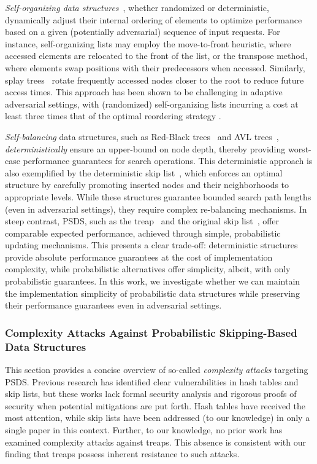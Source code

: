 \emph{Self-organizing data structures}~\cite{albers2005self}, whether randomized or deterministic, dynamically adjust their internal ordering of elements to optimize performance based on a given (potentially adversarial) sequence of input requests. For instance, self-organizing lists may employ the move-to-front heuristic, where accessed elements are relocated to the front of the list, or the transpose method, where elements swap positions with their predecessors when accessed. Similarly, splay trees~\cite{sleator1985self} rotate frequently accessed nodes closer to the root to reduce future access times. This approach has been shown to be challenging in adaptive adversarial settings, with (randomized) self-organizing lists incurring a cost at least three times that of the optimal reordering strategy \cite{reingold1994randomized}. 

\emph{Self-balancing} data structures, such as Red-Black trees~\cite{bayer1972symmetric} and AVL trees~\cite{adel1962algorithm}, \emph{deterministically} ensure an upper-bound on node depth, thereby providing worst-case performance guarantees for search operations. This deterministic approach is also exemplified by the deterministic skip list~\cite{munro1992deterministic}, which enforces an optimal structure by carefully promoting inserted nodes and their neighborhoods to appropriate levels. While these structures guarantee bounded search path lengths (even in adversarial settings), they require complex re-balancing mechanisms. In steep contrast, PSDS, such as the treap~\cite{seidel1996randomized} and the original skip list~\cite{pugh}, offer comparable expected performance, achieved through simple, probabilistic updating mechanisms. This presents a clear trade-off: deterministic structures provide absolute performance guarantees at the cost of implementation complexity, while probabilistic alternatives offer simplicity, albeit, with only probabilistic guarantees. In this work, we investigate whether we can maintain the implementation simplicity of probabilistic data structures while preserving their performance guarantees even in adversarial settings.

\subsubsection{Complexity Attacks Against Probabilistic Skipping-Based Data Structures}

This section provides a concise overview of so-called \emph{complexity attacks} targeting PSDS. Previous research has identified clear vulnerabilities in hash tables and skip lists, but these works lack formal security analysis and rigorous proofs of security when potential mitigations are put forth. Hash tables have received the most attention, while skip lists have been addressed (to our knowledge) in only a single paper in this context. Further, to our knowledge, no prior work has examined complexity attacks against treaps. This absence is consistent with our finding that treaps possess inherent resistance to such attacks.

